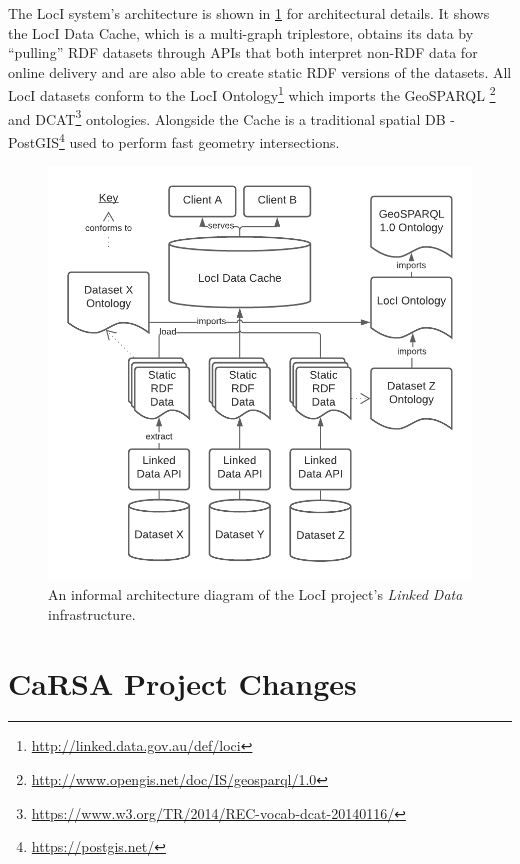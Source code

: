 \documentclass[runningheads]{llncs}
\begin{document}
The LocI system's architecture is shown in \ref{fig:loci-arch} for architectural details. It shows the LocI Data Cache, which is a multi-graph triplestore, 
obtains its data by ``pulling'' RDF datasets through APIs that both interpret non-RDF data for online delivery and are also able to create static RDF 
versions of the datasets. All LocI datasets conform to the LocI Ontology\footnote{\url{http://linked.data.gov.au/def/loci}} which imports the GeoSPARQL
\footnote{\url{http://www.opengis.net/doc/IS/geosparql/1.0}} and DCAT\footnote{\url{https://www.w3.org/TR/2014/REC-vocab-dcat-20140116/}} ontologies. 
Alongside the Cache is a traditional spatial DB - PostGIS\footnote{\url{https://postgis.net/}} used to perform fast geometry intersections.

\begin{figure}[htb]
    \centering
    \includegraphics[width=\linewidth]{images/loci-arch.png}
    \caption{An informal architecture diagram of the LocI project's \textit{Linked Data} infrastructure.}
    \label{fig:loci-arch}
\end{figure}

\section{CaRSA Project Changes}\label{sec:changes}
\end{document}
